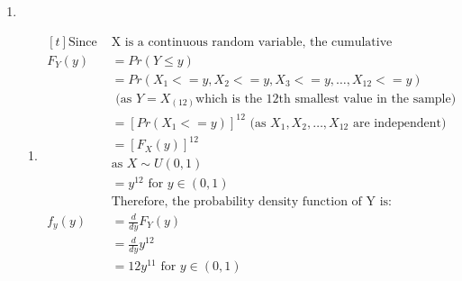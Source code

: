 \documentclass{article}
\begin{document}
\begin{enumerate}
\item 
    \begin{enumerate}[label=(\roman*)]
    \item $\begin{aligned}[t]
    \text{Since } & \text{X is a continuous random variable, the cumulative distribution function of Y is:} \\
    F_Y(y) &= Pr(Y \leq y) \\
    &= Pr(X_1 <= y , X_2 <= y , X_3 <= y , \dots , X_{12} <= y) \\
    & \text{ (as } Y=X_{(12)} \text{which is the 12th smallest value in the sample)} \\
    &= [Pr(X_1 <= y)]^{12} \text{ (as } X_1, X_2, \dots , X_{12} \text{ are independent)} \\
    &= [F_X(y)]^{12} \\
    \ \ & \text{as } X \sim U(0, 1) \\
    &= y^{12} \text{ for } y \in (0, 1) \\
    & \text{Therefore, the probability density function of Y is:} \\
    f_y(y) &= \frac{d}{dy} F_Y(y) \\
    &= \frac{d}{dy} y^{12} \\
    &= 12y^{11} \text{ for } y \in (0, 1) \\
    \end{aligned}$


\end{enumerate}
\end{enumerate}
\end{document}
